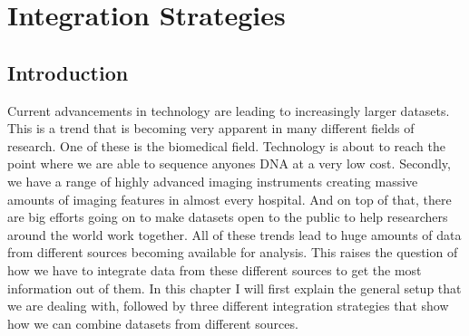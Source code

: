\chapter{Integration Strategies}
\label{cha:integration}

\section{Introduction}
\label{sec:integration-introduction}
Current advancements in technology are leading to increasingly larger datasets\cite{collins2003vision}. This is a trend that is becoming very apparent in many different fields of research. One of these is the biomedical field. Technology is about to reach the point where we are able to sequence anyones DNA at a very low cost\cite{shendure2008next}. Secondly, we have a range of highly advanced imaging instruments creating massive amounts of imaging features in almost every hospital\cite{black1993advances}\cite{medicalimaging}. And on top of that, there are big efforts going on to make datasets open to the public to help researchers around the world work together\cite{stark2006biogrid}\cite{sandelin2004jaspar}\cite{tcga}\cite{smith2007obo}. All of these trends lead to huge amounts of data from different sources becoming available for analysis. This raises the question of how we have to integrate data from these different sources to get the most information out of them. In this chapter I will first explain the general setup that we are dealing with, followed by three different integration strategies that show how we can combine datasets from different sources.

